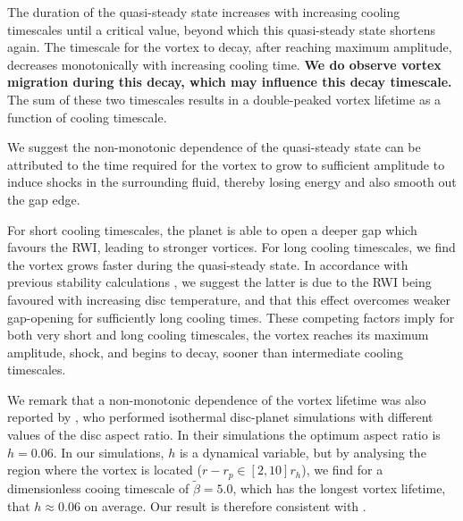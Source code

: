 The duration of the quasi-steady state increases with
increasing cooling timescales until a critical value, beyond which this
quasi-steady state shortens again. The timescale for the vortex to
decay, after reaching maximum amplitude, decreases monotonically with
increasing cooling time. {\bf We do observe vortex migration during this
  decay, which may influence this decay timescale. } 
The sum of
these two timescales results in a double-peaked vortex lifetime as a
function of cooling timescale. 


We suggest the non-monotonic dependence of the quasi-steady state can
be attributed to the time required for the vortex to grow to 
sufficient amplitude to induce shocks in the surrounding fluid,
thereby losing energy and also smooth out the gap edge.   

For short cooling timescales, the planet is able to open a
deeper gap which favours the RWI, leading to stronger 
vortices. For long cooling timescales, we find the vortex
grows faster during the quasi-steady state. In accordance with
previous stability calculations \citep{li00}, we 
suggest the latter is due to the RWI being favoured with increasing
disc temperature, and that this effect overcomes weaker
gap-opening for sufficiently long cooling times. 
These competing factors imply
for both very short and long cooling timescales, the vortex reaches
its maximum amplitude, shock, and begins to decay, sooner than
intermediate cooling timescales.      


We remark that a non-monotonic dependence of the vortex lifetime was
also reported by \cite{fu14}, who performed isothermal disc-planet
simulations with different values of the   
disc aspect ratio. In their simulations the optimum aspect ratio is
$h=0.06$. In our simulations, $h$ is a dynamical
variable, but by analysing the region where the vortex is located
($r-r_p\in[2,10]r_h$), %
we find for a dimensionless cooing timescale of $\tilde\beta=5.0$, which has
the longest vortex lifetime, that  
$h\approx0.06$ on average.  
Our result is therefore consistent with \citep{fu14}. 


